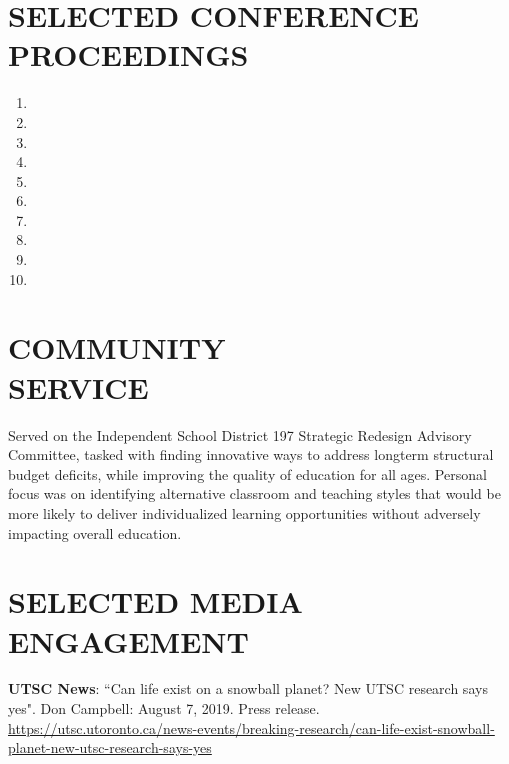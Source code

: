 \documentclass[10pt]{res} %
\begin{document}
\begin{resume}
\section{SELECTED CONFERENCE PROCEEDINGS}

\begin{enumerate}
\item {}
\item {}
\item {}
\item {}
\item {}
\item {}
\item {}
\item {}
\item {}
\item {}
\end{enumerate}


% 
\section{COMMUNITY \\ SERVICE}

Served on the Independent School District 197 Strategic Redesign Advisory Committee, tasked with finding innovative ways to address longterm structural budget deficits, while improving the quality of education for all ages. Personal focus was on identifying alternative classroom and teaching styles that would be more likely to deliver individualized learning opportunities without adversely impacting overall education.


\section{SELECTED MEDIA ENGAGEMENT}

\textbf{UTSC News}: ``Can life exist on a snowball planet? New UTSC research says yes". Don Campbell: August 7, 2019. Press release. \url{https://utsc.utoronto.ca/news-events/breaking-research/can-life-exist-snowball-planet-new-utsc-research-says-yes}


\end{resume}
\end{document}
